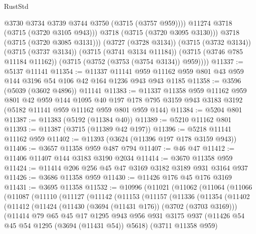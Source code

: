 \begin{lexlean}{RustStd}
\begin{coremodule}
                  @3730
                  @3734
                  @3739
                  @3744
                  @3750
                  (@3715 (@3757 @959))))
              @11274
              @3718
              (@3715 (@3720 @3105 @943)))
            @3718
            (@3715 (@3720 @3095 @3130)))
          @3718
          (@3715 (@3720 @3085 @3131)))
        (@3727 (@3728 @3134))
        (@3715 (@3732 @3134))
        (@3715 (@3737 @3134))
        (@3715 (@3741 @3134 @11184))
        (@3715 (@3746 @785 @11184 @11162))
        (@3715 (@3752 (@3753 (@3754 @3134)) @959))))
@11337 := @5137 @11141
@11354 := @11337
    @11141
    @959
    @11162
    @959
    @801
    @43
    @959
    @144
    @3196
    @54
    @106
    @42
    @164
    @1236
    @943
    @943
    @1185
@11358 := @3596 (@5039 (@3602 @4896)) @11141
@11383 := @11337
    @11358
    @959
    @11162
    @959
    @801
    @42
    @959
    @144
    @1095
    @40
    @197
    @178
    @795
    @3159
    @943
    @3183
    @3192
    (@5182 @11141 @959 @11162 @959 @801 @959 @144)
@11384 := @5204 @801
@11387 := @11383 (@5192 (@11384 @40))
@11389 := @5210 @11162 @801
@11393 := @11387 (@3715 (@11389 @42 @197))
@11396 := @5218 @11141 @11162 @959
@11402 := @11393 (@3624 (@11396 @197 @178 @3159 @943))
@11406 := @3657 @11358 @959 @487 @794
@11407 := @46 @47
@11412 := @11406 @11407 @144 @3183 @3190 @2034
@11414 := @3670 @11358 @959
@11424 := @11414 @206 @256 @45 @47 @3169 @3182 @3189 @931 @3164 @937
@11426 := @3686 @11358 @959
@11430 := @11426 @176 @45 @176 @3169
@11431 := @3695 @11358
@11532 := @10996
    (@11021
      (@11062
        (@11064
          (@11066
            (@11087
              (@11110
                (@11127
                  (@11142
                    (@11153
                      (@11157
                        (@11336
                          (@11354
                            (@11402
                              (@11412
                                (@11424
                                  (@11430 (@3694 (@11431 @176)) (@3702 (@3703 @3169)))
                                  (@11414
                                    @79
                                    @65
                                    @45
                                    @17
                                    @1295
                                    @943
                                    @956
                                    @931
                                    @3175
                                    @937
                                    (@11426 @54 @45 @54 @1295 (@3694 (@11431 @54)) @5618)
                                    (@3711 @11358 @959)

\end{coremodule}
\end{lexlean}
